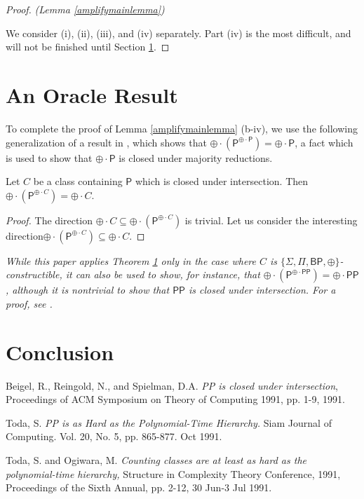 \documentclass[11pt]{article}
\newcommand{\bp}{\textsf{BP}}
\newcommand{\parity}{\oplus}
\newcommand{\p}{\textsf{P}}
\newcommand{\pp}{\textsf{PP}}
\begin{document}
\begin{proof} \emph{(Lemma \ref{amplifymainlemma})}

We consider (i), (ii), (iii), and (iv) separately. Part (iv) is the most difficult, and will not be finished until Section \ref{oracle}.
\end{proof}

\section{An Oracle Result}\label{oracle}

To complete the proof of Lemma \ref{amplifymainlemma} (b-iv), we use the following generalization of a result in \cite{Toda}, which shows that $\parity \cdot (\p ^{\parity\cdot\p}) = \parity\cdot\p$, a fact which is used to show that $\parity \cdot \p$ is closed under majority reductions.

\begin{theorem}\label{oracleparityc}
Let $C$ be a class containing \emph{$\p$} which is closed under intersection. Then\linebreak \emph{$\parity \cdot (\p^{\parity \cdot C}) = \parity \cdot C$}.
\end{theorem}
\begin{proof}
The direction $\parity \cdot C \subseteq \parity \cdot (\p^{\parity \cdot C})$ is trivial. Let us consider the interesting direction\linebreak $\parity \cdot (\p^{\parity \cdot C})\subseteq \parity\cdot C$.
\end{proof}
\begin{remark}\emph{
While this paper applies Theorem \ref{oracle} only in the case where $C$ is $\{\Sigma,\Pi,\bp,\parity\}$-constructible, it can also be used to show, for instance, that $\parity \cdot (\p^{\parity \cdot \pp}) = \parity \cdot \pp$, although it is nontrivial to show that $\pp$ is closed under intersection. For a proof, see \cite{Beigel}.
}\end{remark}

\section{Conclusion}

\pagebreak

\begin{thebibliography}{9}

 Beigel, R., Reingold, N., and Spielman, D.A. \emph{PP is closed under intersection}, Proceedings of ACM Symposium on Theory of Computing 1991, pp. 1-9, 1991.

Toda, S. \emph{PP is as Hard as the Polynomial-Time Hierarchy.} Siam Journal of Computing. Vol. 20, No. 5, pp. 865-877. Oct 1991.

 Toda, S. and Ogiwara, M. \emph{Counting classes are at least as hard as the polynomial-time hierarchy,} Structure in Complexity Theory Conference, 1991, Proceedings of the Sixth Annual, pp. 2-12, 30 Jun-3 Jul 1991.

\end{thebibliography}
\end{document}
